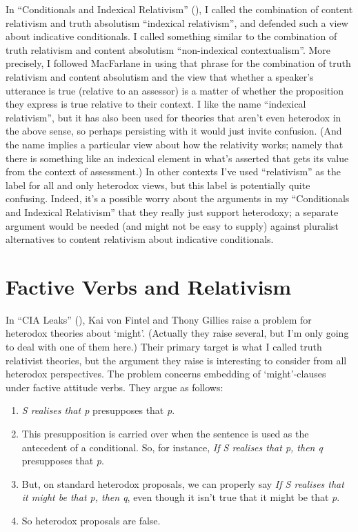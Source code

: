 \documentclass[
  11pt,
  letterpaper,
  DIV=11,
  numbers=noendperiod,
  twoside]{scrartcl}
\providecommand{\tightlist}{%
  \setlength{\itemsep}{0pt}\setlength{\parskip}{0pt}}
\begin{document}
In ``Conditionals and Indexical Relativism''
(), I called the
combination of content relativism and truth absolutism ``indexical
relativism'', and defended such a view about indicative conditionals. I
called something similar to the combination of truth relativism and
content absolutism ``non-indexical contextualism''. More precisely, I
followed MacFarlane in using that phrase for the combination of truth
relativism and content absolutism and the view that whether a speaker's
utterance is true (relative to an assessor) is a matter of whether the
proposition they express is true relative to their context. I like the
name ``indexical relativism'', but it has also been used for theories
that aren't even heterodox in the above sense, so perhaps persisting
with it would just invite confusion. (And the name implies a particular
view about how the relativity works; namely that there is something like
an indexical element in what's asserted that gets its value from the
context of assessment.) In other contexts I've used ``relativism'' as
the label for all and only heterodox views, but this label is
potentially quite confusing. Indeed, it's a possible worry about the
arguments in my ``Conditionals and Indexical Relativism'' that they
really just support heterodoxy; a separate argument would be needed (and
might not be easy to supply) against pluralist alternatives to content
relativism about indicative conditionals.

\section{Factive Verbs and
Relativism}\label{factive-verbs-and-relativism}

In ``CIA Leaks'' (), Kai von Fintel and Thony Gillies raise a problem for heterodox
theories about `might'. (Actually they raise several, but I'm only going
to deal with one of them here.) Their primary target is what I called
truth relativist theories, but the argument they raise is interesting to
consider from all heterodox perspectives. The problem concerns embedding
of `might'-clauses under factive attitude verbs. They argue as follows:

\begin{enumerate}
\def\labelenumi{\arabic{enumi}.}
\tightlist
\item
  \emph{S realises that p} presupposes that \emph{p}.
\item
  This presupposition is carried over when the sentence is used as the
  antecedent of a conditional. So, for instance, \emph{If S realises
  that p, then q} presupposes that \emph{p}.
\item
  But, on standard heterodox proposals, we can properly say \emph{If S
  realises that it might be that p, then q}, even though it isn't true
  that it might be that \emph{p}.
\item
  So heterodox proposals are false.
\end{enumerate}
\end{document}
